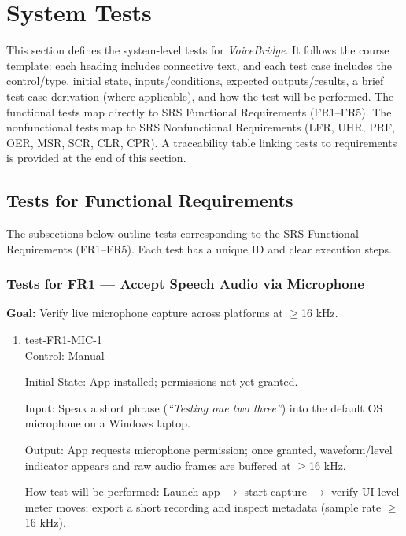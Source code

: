 \documentclass[12pt, titlepage]{article}
\begin{document}
\section{System Tests}

This section defines the system-level tests for \emph{VoiceBridge}. It follows the course template: each heading includes connective text, and each test case includes the control/type, initial state, inputs/conditions, expected outputs/results, a brief test-case derivation (where applicable), and how the test will be performed. The functional tests map directly to SRS Functional Requirements (FR1–FR5). The nonfunctional tests map to SRS Nonfunctional Requirements (LFR, UHR, PRF, OER, MSR, SCR, CLR, CPR). A traceability table linking tests to requirements is provided at the end of this section.

\subsection{Tests for Functional Requirements}

The subsections below outline tests corresponding to the SRS Functional Requirements (FR1--FR5).
Each test has a unique ID and clear execution steps.

\subsubsection{Tests for FR1 — Accept Speech Audio via Microphone}

\textbf{Goal:} Verify live microphone capture across platforms at $\geq$16 kHz.

\begin{enumerate}

\item{test-FR1-MIC-1\\}
Control: Manual

Initial State: App installed; permissions not yet granted.

Input: Speak a short phrase (\textit{``Testing one two three''}) into the default OS microphone on a Windows laptop.

Output: App requests microphone permission; once granted, waveform/level indicator appears and raw audio frames are buffered at $\geq$16 kHz.

How test will be performed: Launch app $\rightarrow$ start capture $\rightarrow$ verify UI level meter moves; export a short recording and inspect metadata (sample rate $\geq$16 kHz).
\end{enumerate}
\end{document}
